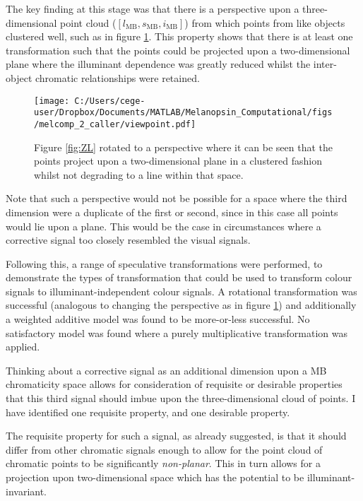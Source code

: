 \documentclass{article}
\begin{document}
The key finding at this stage was that there is a perspective upon a three-dimensional point cloud ($[l_{\text{MB}},s_{\text{MB}},i_{\text{MB}}]$) from which points from like objects clustered well, such as in figure \ref{fig:viewpoint}. This property shows that there is at least one transformation such that the points could be projected upon a two-dimensional plane where the illuminant dependence was greatly reduced whilst the inter-object chromatic relationships were retained. 

\begin{figure}[h]
    \centering
    \texttt{[image: C:/Users/cege-user/Dropbox/Documents/MATLAB/Melanopsin\_Computational/figs/melcomp\_2\_caller/viewpoint.pdf]}
    \caption{Figure \ref{fig:ZL} rotated to a perspective where it can be seen that the points project upon a two-dimensional plane in a clustered fashion whilst not degrading to a line within that space.}
    \label{fig:viewpoint}
\end{figure} 

Note that such a perspective would not be possible for a space where the third dimension were a duplicate of the first or second, since in this case all points would lie upon a plane. This would be the case in circumstances where a corrective signal too closely resembled the visual signals.

Following this, a range of speculative transformations were performed, to demonstrate the types of transformation that could be used to transform colour signals to illuminant-independent colour signals. A rotational transformation was successful (analogous to changing the perspective as in figure \ref{fig:viewpoint}) and additionally a weighted additive model was found to be more-or-less successful. No satisfactory model was found where a purely multiplicative transformation was applied.

Thinking about a corrective signal as an additional dimension upon a \ac{MB} chromaticity space allows for consideration of requisite or desirable properties that this third signal should imbue upon the three-dimensional cloud of points. I have identified one requisite property, and one desirable property. 

The requisite property for such a signal, as already suggested, is that it should differ from other chromatic signals enough to allow for the point cloud of chromatic points to be significantly \emph{non-planar}. This in turn allows for a projection upon two-dimensional space which has the potential to be illuminant-invariant.
\end{document}
